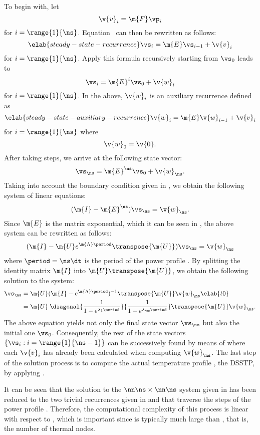 To begin with, let
\[
  \v{v}_i = \m{F} \vp_i
\]
for $i = \range{1}{\ns}$. Equation~ can then be rewritten as
follows:
\begin{equation} \elab{steady-state-recurrence}
  \vs_i = \m{E} \vs_{i - 1} + \v{v}_i
\end{equation}
for $i = \range{1}{\ns}$. Apply this formula recursively starting from $\vs_0$
leads to
\[
  \vs_i = \m{E}^i \vs_0 + \v{w}_i
\]
for $i = \range{1}{\ns}$. In the above, $\v{w}_i$ is an auxiliary recurrence
defined as
\begin{equation} \elab{steady-state-auxiliary-recurrence}
  \v{w}_i = \m{E} \v{w}_{i - 1} + \v{v}_i
\end{equation}
for $i = \range{1}{\ns}$ where
\[
  \v{w}_0 = \v{0}.
\]
After taking \ns steps, we arrive at the following state vector:
\[
  \vs_\ns = \m{E}^\ns \vs_0 + \v{w}_\ns.
\]
Taking into account the boundary condition given in ,
we obtain the following system of linear equations:
\[
  (\m{I} - \m{E}^\ns) \vs_\ns = \v{w}_\ns.
\]
Since $\m{E}$ is the matrix exponential, which it can be seen in
, the above system can be rewritten as follows:
\[
  (\m{I} - \m{U} e^{\m{\Lambda} \period} \transpose{\m{U}}) \vs_\ns = \v{w}_\ns
\]
where $\period = \ns \dt$ is the period of the power profile \mp. By splitting
the identity matrix $\m{I}$ into $\m{U} \transpose{\m{U}}$, we obtain the
following solution to the system:
\begin{align}
  \vs_\ns
  & = \m{U} (\m{I} - e^{\m{\Lambda} \period})^{-1} \transpose{\m{U}} \v{w}_\ns \elab{t0} \\
  & = \m{U} \: \diagonal{\frac{1}{1 - e^{\lambda_1 \period}}}{\frac{1}{1 - e^{\lambda_\ns \period}}} \transpose{\m{U}} \v{w}_\ns. \nonumber
\end{align}
The above equation yields not only the final state vector $\vs_\ns$ but also the
initial one $\vs_0$. Consequently, the rest of the state vectors $\{ \vs_i: i =
\range{1}{\ns - 1} \}$ can be successively found by means of
 where each $\v{v}_i$ has already been calculated
when computing $\v{w}_\ns$. The last step of the solution process is to compute
the actual temperature profile \mq, the \ac{DSSTP}, by applying
.

It can be seen that the solution to the $\nn \ns \times \nn \ns$ system given in
 has been reduced to the two trivial recurrences given
in  and 
that traverse the \ns steps of the power profile \mp. Therefore, the
computational complexity of this process is linear with respect to \ns, which is
important since \ns is typically much large than \nn, that is, the number of
thermal nodes.

